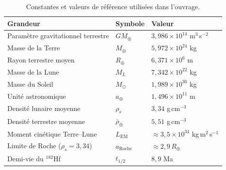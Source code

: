 \documentclass[11pt,a4paper,openany]{report}
\newcommand{\Mt}{M_{\oplus}}
\newcommand{\Rt}{R_{\oplus}}
\newcommand{\aR}{a_{\mathrm{Roche}}}
\begin{document}
\begin{table}[htbp]
\centering
\small
\caption{Constantes et valeurs de référence utilisées dans l'ouvrage.}
\label{tab:constantes}
\begin{tabular}{lll}
\toprule
\textbf{Grandeur} & \textbf{Symbole} & \textbf{Valeur} \\
\midrule
Paramètre gravitationnel terrestre & $G\Mt$ & $3{,}986\times10^{14}$ m$^3$\,s$^{-2}$ \\
Masse de la Terre & $\Mt$ & $5{,}972\times10^{24}$ kg \\
Rayon terrestre moyen & $\Rt$ & $6{,}371\times10^{6}$ m \\
Masse de la Lune & $M_L$ & $7{,}342\times10^{22}$ kg \\
Masse du Soleil & $M_\odot$ & $1{,}989\times10^{30}$ kg \\
Unité astronomique & $a_\oplus$ & $1{,}496\times10^{11}$ m \\
Densité lunaire moyenne & $\rho_s$ & $3{,}34$ g\,cm$^{-3}$ \\
Densité terrestre moyenne & $\bar\rho_\oplus$ & $5{,}51$ g\,cm$^{-3}$ \\
Moment cinétique Terre--Lune & $L_{\mathrm{EM}}$ & $\approx3{,}5\times10^{34}$ kg\,m$^2$\,s$^{-1}$ \\
Limite de Roche ($\rho_s=3{,}34$) & $\aR$ & $\approx2{,}9\,\Rt$ \\
Demi-vie du $^{182}$Hf & $t_{1/2}$ & $8{,}9$ Ma \\
\bottomrule
\end{tabular}
\end{table}
\end{document}
